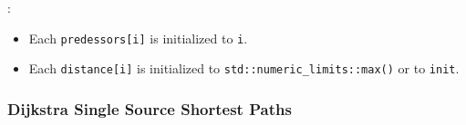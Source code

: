{\small

}



\begin{itemdescr}
\pnum
\effects:
\begin{itemize}
\item
  Each \lstinline{predessors[i]} is initialized to \lstinline{i}.
\item Each 
\lstinline{distance[i]} is initialized to \lstinline{std::numeric_limits::max()}
or to \lstinline{init}.
\end{itemize}
\end{itemdescr}


\subsubsection{Dijkstra Single Source Shortest Paths}

{\small

}

